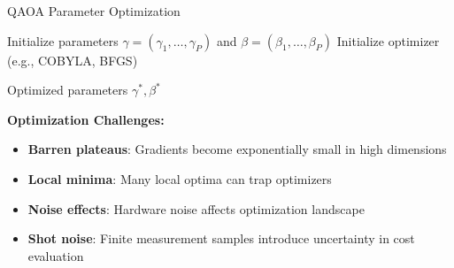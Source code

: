\begin{algorithm}
  \caption{QAOA Parameter Optimization}
  \label{alg:parameter-optimization}


  Initialize parameters $\gamma = (\gamma_1, \ldots, \gamma_P)$ and $\beta = (\beta_1, \ldots, \beta_P)$\;
  Initialize optimizer (e.g., COBYLA, BFGS)\;



  \Return Optimized parameters $\gamma^*, \beta^*$\;
\end{algorithm}

\vspace{0.3cm}

\noindent
\textbf{Optimization Challenges:}
\begin{itemize}
  \item \textbf{Barren plateaus}: Gradients become exponentially small in
    high dimensions

  \item \textbf{Local minima}: Many local optima can trap optimizers

  \item \textbf{Noise effects}: Hardware noise affects optimization landscape

  \item \textbf{Shot noise}: Finite measurement samples introduce uncertainty
    in cost evaluation
\end{itemize}


